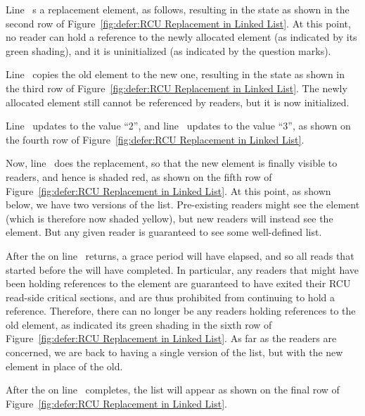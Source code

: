 \begin{lineref}
Line~ s a replacement element, as follows,
resulting in the state as shown in the second row of
Figure~\ref{fig:defer:RCU Replacement in Linked List}.
At this point, no reader can hold a reference to the newly allocated
element (as indicated by its green shading), and it is uninitialized
(as indicated by the question marks).

Line~ copies the old element to the new one, resulting in the
state as shown in the third row of
Figure~\ref{fig:defer:RCU Replacement in Linked List}.
The newly allocated element still cannot be referenced by readers, but
it is now initialized.

Line~ updates  to the value ``2'', and
line~ updates  to the value ``3'',
as shown on the fourth row of
Figure~\ref{fig:defer:RCU Replacement in Linked List}.

Now, line~ does the replacement, so that the new element is
finally visible to readers, and hence is shaded red, as shown on
the fifth row of
Figure~\ref{fig:defer:RCU Replacement in Linked List}.
At this point, as shown below, we have two versions of the list.
Pre-existing readers might see the  element (which is
therefore now shaded yellow), but
new readers will instead see the  element.
But any given reader is guaranteed to see some well-defined list.

After the  on line~ returns,
a grace period will have elapsed, and so all reads that started before the
 will have completed.
In particular, any readers that might have been holding references
to the  element are guaranteed to have exited
their RCU read-side critical sections, and are thus prohibited from
continuing to hold a reference.
Therefore, there can no longer be any readers holding references
to the old element, as indicated its green shading in the sixth row of
Figure~\ref{fig:defer:RCU Replacement in Linked List}.
As far as the readers are concerned, we are back to having a single version
of the list, but with the new element in place of the old.

After the  on line~ completes, the list will
appear as shown on the final row of
Figure~\ref{fig:defer:RCU Replacement in Linked List}.
\end{lineref}

